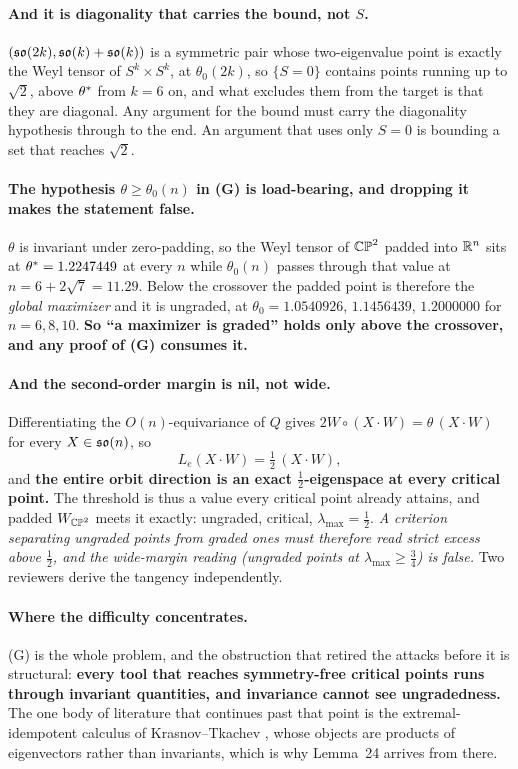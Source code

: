 \paragraph{And it is diagonality that carries the bound, not $S$.} $(\mathfrak{so}(2k),\mathfrak{so}(k)+\mathfrak{so}(k))$ is a symmetric pair whose two-eigenvalue point is exactly the Weyl tensor of $S^k\times S^k$, at $\theta_0(2k)$, so $\{S=0\}$ contains points running up to $\sqrt2$, above $\theta^{*}$ from $k=6$ on, and what excludes them from the target is that they are diagonal. Any argument for the bound must carry the diagonality hypothesis through to the end. An argument that uses only $S=0$ is bounding a set that reaches $\sqrt2$.

\paragraph{The hypothesis $\theta\ge\theta_0(n)$ in (G) is load-bearing, and dropping it makes the statement false.} $\theta$ is invariant under zero-padding, so the Weyl tensor of $\mathbb{CP}^2$ padded into $\mathbb{R}^n$ sits at $\theta^{*}=1.2247449$ at every $n$ while $\theta_0(n)$ passes through that value at $n=6+2\sqrt7=11.29$. Below the crossover the padded point is therefore the \emph{global maximizer} and it is ungraded, at $\theta_0=1.0540926$, $1.1456439$, $1.2000000$ for $n=6,8,10$. \textbf{So ``a maximizer is graded'' holds only above the crossover, and any proof of (G) consumes it.}

\paragraph{And the second-order margin is nil, not wide.} Differentiating the $O(n)$-equivariance of $Q$ gives $2W\circ(X\cdot W)=\theta\,(X\cdot W)$ for every $X\in\mathfrak{so}(n)$, so
\[
L_e(X\cdot W)=\tfrac12\,(X\cdot W),
\]
and \textbf{the entire orbit direction is an exact $\tfrac12$-eigenspace at every critical point.} The threshold is thus a value every critical point already attains, and padded $W_{\mathbb{CP}^2}$ meets it exactly: ungraded, critical, $\lambda_{\max}=\tfrac12$. \emph{A criterion separating ungraded points from graded ones must therefore read strict excess above $\tfrac12$, and the wide-margin reading (ungraded points at $\lambda_{\max}\ge\tfrac34$) is false.} Two reviewers derive the tangency independently.

\paragraph{Where the difficulty concentrates.} (G) is the whole problem, and the obstruction that retired the attacks before it is structural: \textbf{every tool that reaches symmetry-free critical points runs through invariant quantities, and invariance cannot see ungradedness.} The one body of literature that continues past that point is the extremal-idempotent calculus of Krasnov--Tkachev \cite{kt2018,tkachev2019}, whose objects are products of eigenvectors rather than invariants, which is why Lemma~24 arrives from there.


